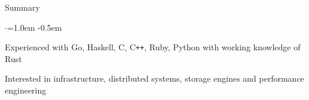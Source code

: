 \documentclass{resume} %
\begin{document}

\begin{rSection}{Summary}
  \vspace {0.5em}
  \begin{list}{$\cdot$}{\leftmargin=1.0em}
    \itemsep -0.5em \vspace{-0.5em}
    \item Experienced with Go, Haskell, C, C\texttt{++}, Ruby, Python with
      working knowledge of Rust
    \item Interested in infrastructure, distributed systems, storage engines
      and performance engineering
  \end{list}
  \vspace{0.5em}
\end{rSection}

\end{document}
